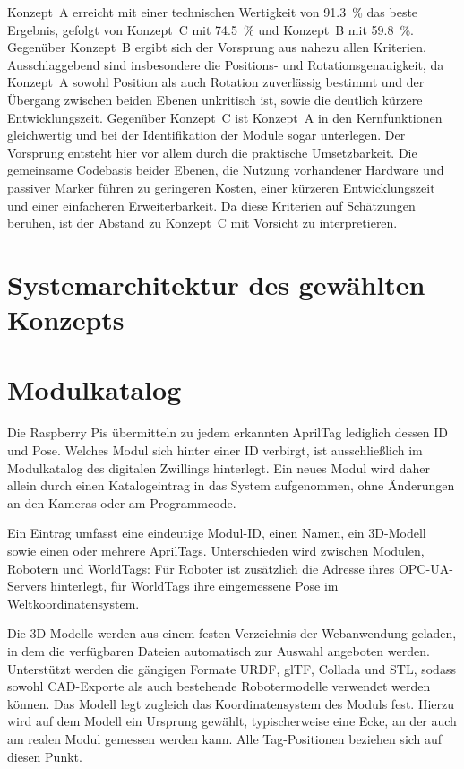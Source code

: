 Konzept~A erreicht mit einer technischen Wertigkeit von \SI{91,3}{\percent} das beste Ergebnis, gefolgt von Konzept~C mit \SI{74,5}{\percent} und Konzept~B mit \SI{59,8}{\percent}. Gegenüber Konzept~B ergibt sich der Vorsprung aus nahezu allen Kriterien. Ausschlaggebend sind insbesondere die Positions- und Rotationsgenauigkeit, da Konzept~A sowohl Position als auch Rotation zuverlässig bestimmt und der Übergang zwischen beiden Ebenen unkritisch ist, sowie die deutlich kürzere Entwicklungszeit. Gegenüber Konzept~C ist Konzept~A in den Kernfunktionen gleichwertig und bei der Identifikation der Module sogar unterlegen. Der Vorsprung entsteht hier vor allem durch die praktische Umsetzbarkeit. Die gemeinsame Codebasis beider Ebenen, die Nutzung vorhandener Hardware und passiver Marker führen zu geringeren Kosten, einer kürzeren Entwicklungszeit und einer einfacheren Erweiterbarkeit. Da diese Kriterien auf Schätzungen beruhen, ist der Abstand zu Konzept~C mit Vorsicht zu interpretieren.




\section{Systemarchitektur des gewählten Konzepts}
\label{sec:Systemarchitektur des gewählten Konzepts}

\section{Modulkatalog}
\label{sec:Modulkatalog}
Die Raspberry Pis übermitteln zu jedem erkannten AprilTag lediglich dessen ID und Pose. Welches Modul sich hinter einer ID verbirgt, ist ausschließlich im Modulkatalog des digitalen Zwillings hinterlegt. Ein neues Modul wird daher allein durch einen Katalogeintrag in das System aufgenommen, ohne Änderungen an den Kameras oder am Programmcode.

Ein Eintrag umfasst eine eindeutige Modul-ID, einen Namen, ein 3D-Modell sowie einen oder mehrere AprilTags. Unterschieden wird zwischen Modulen, Robotern und WorldTags: Für Roboter ist zusätzlich die Adresse ihres OPC-UA-Servers hinterlegt, für WorldTags ihre eingemessene Pose im Weltkoordinatensystem.

Die 3D-Modelle werden aus einem festen Verzeichnis der Webanwendung geladen, in dem die verfügbaren Dateien automatisch zur Auswahl angeboten werden. Unterstützt werden die gängigen Formate URDF, glTF, Collada und STL, sodass sowohl CAD-Exporte als auch bestehende Robotermodelle verwendet werden können. Das Modell legt zugleich das Koordinatensystem des Moduls fest. Hierzu wird auf dem Modell ein Ursprung gewählt, typischerweise eine Ecke, an der auch am realen Modul gemessen werden kann. Alle Tag-Positionen beziehen sich auf diesen Punkt.

